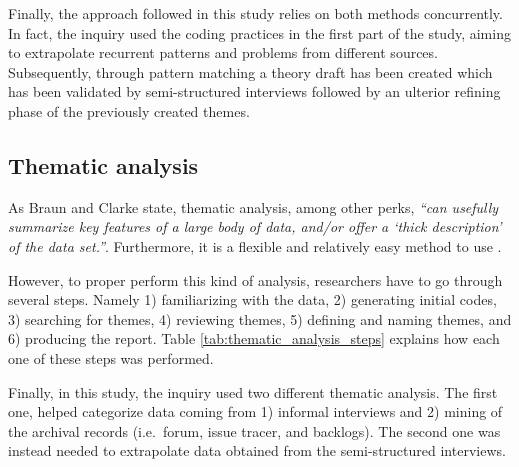 Finally, the approach followed in this study relies on both methods concurrently. In fact, the inquiry used the coding practices in the first part of the study, aiming to extrapolate recurrent patterns and problems from different sources. Subsequently, through pattern matching a theory draft has been created which has been validated by semi-structured interviews followed by an ulterior refining phase of the previously created themes.

\subsection{Thematic analysis}
As Braun and Clarke \cite{thematic_analysis} state, thematic analysis, among other perks, \textit{``can usefully summarize key features of a large body of data, and/or offer a ‘thick description’ of the data set.''}. Furthermore, it is a flexible and relatively easy method to use \cite{thematic_analysis}.

However, to proper perform this kind of analysis, researchers have to go through several steps. Namely 1) familiarizing with the data, 2) generating initial codes, 3) searching for themes, 4) reviewing themes, 5) defining and naming themes, and 6) producing the report. Table \ref{tab:thematic_analysis_steps} explains how each one of these steps was performed.

Finally, in this study, the inquiry used two different thematic analysis. The first one, helped categorize data coming from 1) informal interviews and 2) mining of the archival records (i.e.\ forum, issue tracer, and backlogs). The second one was instead needed to extrapolate data obtained from the semi-structured interviews.


